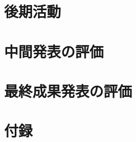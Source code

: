 \documentclass[11pt,a4paper,oneside]{jsbook}
\begin{document}
\chapter{後期活動}

\chapter{中間発表の評価}

\chapter{最終成果発表の評価}




\chapter{付録}



%
%
%
\end{document}
